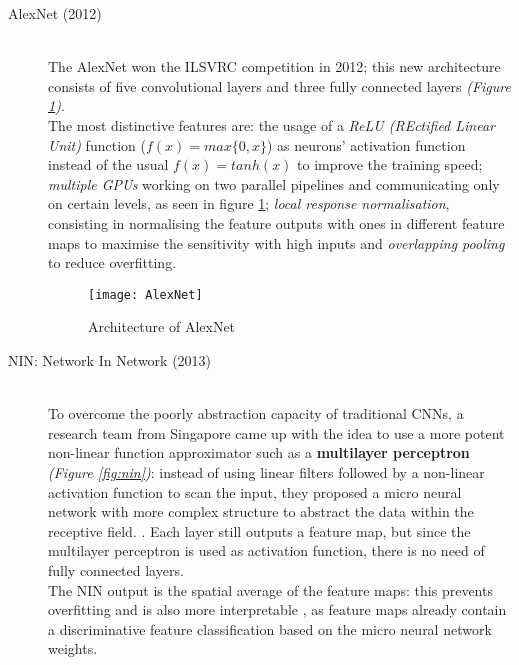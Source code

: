 \documentclass[../main.tex]{subfiles}
\begin{document}
\vspace*{5mm}
\begin{description}
\item[AlexNet (2012)] \cite{Krizhevsky2012} \hfill \\
The AlexNet won the ILSVRC competition in 2012; this new architecture consists of five convolutional layers and three fully connected layers \textit{(Figure \ref{fig:alexnet})}.\\
The most distinctive features are: the usage of a \textit{ReLU (REctified Linear Unit)} function ($f(x)=max\{0,x\}$) as neurons' activation function instead of the usual $f(x)=tanh(x)$ to improve the training speed; \textit{multiple GPUs} working on two parallel pipelines and communicating only on certain levels, as seen in figure \ref{fig:alexnet}; \textit{local response normalisation}, consisting in normalising the feature outputs with ones in different feature maps to maximise the sensitivity with high inputs and \textit{overlapping pooling} to reduce overfitting. \cite{Krizhevsky2012} %

\vspace*{7mm}
\begin{figure}[H]
  \centering
  \texttt{[image: AlexNet]}
  \caption{Architecture of AlexNet \cite{Krizhevsky2012}}
  \label{fig:alexnet}
\end{figure}
\clearpage
\newpage


\vspace*{5mm}
\item[NIN: Network In Network (2013)] \cite{Lin2013} \hfill \\ 
To overcome the poorly abstraction capacity of traditional CNNs, a research team from Singapore came up with the idea to use a more potent non-linear function approximator such as a \textbf{multilayer perceptron} \textit{(Figure \ref{fig:nin})}: instead of using linear filters followed by a non-linear activation function to scan the input, they proposed a micro neural network with more complex structure to abstract the data within the receptive field. \cite{Lin2013}. Each layer still outputs a feature map, but since the multilayer perceptron is used as activation function, there is no need of fully connected layers. \\ The NIN output is the spatial average of the feature maps: this prevents overfitting and is also more interpretable \cite{Lin2013}, as feature maps already contain a discriminative feature classification based on the micro neural network weights. \\


\end{description}
\end{document}
